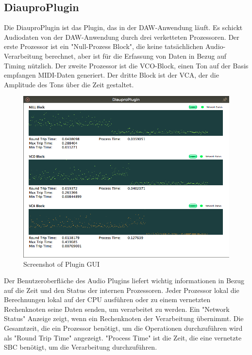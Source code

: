 \subsection{DiauproPlugin}

Die DiauproPlugin ist das Plugin, das in der DAW-Anwendung läuft. Es schickt Audiodaten von der DAW-Anwendung durch drei verketteten Prozessoren. Der erste Prozessor ist ein "Null-Prozess Block", die keine tatsächlichen Audio-Verarbeitung berechnet, aber ist für die Erfassung von Daten in Bezug auf Timing nützlich. Der zweite Prozessor ist die VCO-Block, einen Ton auf der Basis empfangen MIDI-Daten generiert. Der dritte Block ist der VCA, der die Amplitude des Tons über die Zeit gestaltet.

\begin{figure}[H]
    \centering
    \includegraphics[width=\textwidth]{assets/plugin.png}
    \caption{Screenshot of Plugin GUI}
    \label{fig:plugin}
\end{figure}

Der Benutzeroberfläche des Audio Plugins liefert wichtig informationen in Bezug auf die Zeit und den Status der internen Prozessoren. Jeder Prozessor lokal die Berechnungen lokal auf der CPU ausführen oder zu einem vernetzten Rechenknoten seine Daten senden, um verarbeitet zu werden. Ein "Network Status" Anzeige zeigt, wenn ein Rechenknoten der Verarbeitung übernimmt. Die Gesamtzeit, die ein Prozessor benötigt, um die Operationen durchzuführen wird als "Round Trip Time" angezeigt. "Process Time" ist die Zeit, die eine vernetzte SBC benötigt, um die Verarbeitung durchzuführen.

